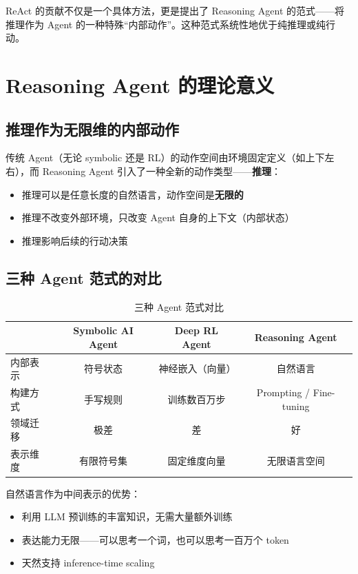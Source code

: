 \documentclass[a4paper]{article}
\begin{document}
ReAct 的贡献不仅是一个具体方法，更是提出了 Reasoning Agent 的范式——将推理作为 Agent 的一种特殊``内部动作''。这种范式系统性地优于纯推理或纯行动。

\section{Reasoning Agent 的理论意义}

\subsection{推理作为无限维的内部动作}

传统 Agent（无论 symbolic 还是 RL）的动作空间由环境固定定义（如上下左右），而 Reasoning Agent 引入了一种全新的动作类型——\textbf{推理}：

\begin{itemize}
    \item 推理可以是任意长度的自然语言，动作空间是\textbf{无限的}
    \item 推理不改变外部环境，只改变 Agent 自身的上下文（内部状态）
    \item 推理影响后续的行动决策
\end{itemize}

\subsection{三种 Agent 范式的对比}

\begin{table}[H]
\centering
\begin{tabular}{lccc}
\toprule
& \textbf{Symbolic AI Agent} & \textbf{Deep RL Agent} & \textbf{Reasoning Agent} \\
\midrule
内部表示 & 符号状态 & 神经嵌入（向量） & 自然语言 \\
构建方式 & 手写规则 & 训练数百万步 & Prompting / Fine-tuning \\
领域迁移 & 极差 & 差 & 好 \\
表示维度 & 有限符号集 & 固定维度向量 & 无限语言空间 \\
\bottomrule
\end{tabular}
\caption{三种 Agent 范式对比}
\end{table}

自然语言作为中间表示的优势：
\begin{itemize}
    \item 利用 LLM 预训练的丰富知识，无需大量额外训练
    \item 表达能力无限——可以思考一个词，也可以思考一百万个 token
    \item 天然支持 inference-time scaling
\end{itemize}
\end{document}
